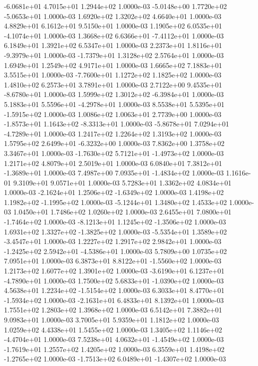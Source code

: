 -6.0681e+01  4.7015e+01  1.2944e+02  1.0000e-03
-5.0148e+00  1.7720e+02 -5.0653e+01  1.0000e-03
1.6920e+02 1.3202e+02 4.6640e+01  1.0000e-03
4.8829e+01 6.1612e+01 9.5150e+01  1.0000e-03
 1.1905e+02  6.0535e+01 -4.1074e+01  1.0000e-03
 1.3668e+02  6.6366e+01 -7.4112e+01  1.0000e-03
6.1849e+01 1.3921e+02 6.5347e+01  1.0000e-03
 2.2373e+01  1.8116e+01 -9.3979e+01  1.0000e-03
-1.7379e+01  1.3128e+02  2.5764e+01  1.0000e-03
1.6949e+01 1.2549e+02 4.9171e+01  1.0000e-03
1.6665e+02 7.1883e+01 3.5515e+01  1.0000e-03
-7.7600e+01  1.1272e+02  1.1825e+02  1.0000e-03
1.4810e+02 6.2573e+01 3.7891e+01  1.0000e-03
 2.7122e+00  9.4535e+01 -8.6780e+01  1.0000e-03
 1.5999e+02  1.3012e+02 -6.3984e+01  1.0000e-03
 5.1883e+01  5.5596e+01 -4.2978e+01  1.0000e-03
 8.5538e+01  5.5395e+01 -1.5915e+02  1.0000e-03
1.0086e+02 1.0063e+01 2.7739e+00  1.0000e-03
-1.8573e+01  1.1643e+02 -8.3313e+01  1.0000e-03
-5.8678e+01  7.0294e+01 -4.7289e+01  1.0000e-03
1.2417e+02 1.2264e+02 1.3193e+02  1.0000e-03
 1.5795e+02  2.6499e+01 -6.3232e+00  1.0000e-03
7.8362e+00 1.3758e+02 3.3467e+01  1.0000e-03
-1.7630e+02  5.7121e+01 -1.4973e+02  1.0000e-03
1.2171e+02 4.8079e+01 2.5019e+01  1.0000e-03
 6.0840e+01  7.3812e+01 -1.3689e+01  1.0000e-03
 7.4987e+00  7.0935e+01 -1.4834e+02  1.0000e-03
1.1616e-01 9.3109e+01 9.0571e+01  1.0000e-03
5.7283e+01 1.3362e+02 4.0834e+01  1.0000e-03
-2.1624e+01  1.2506e+02 -1.6349e+02  1.0000e-03
 1.4198e+02  1.1982e+02 -1.1995e+02  1.0000e-03
-5.1244e+01  1.3480e+02  1.4533e+02  1.0000e-03
1.0450e+01 1.7486e+02 1.0260e+02  1.0000e-03
 2.6455e+01  7.0800e+01 -1.7464e+02  1.0000e-03
-8.1213e+01  1.1245e+02 -1.3506e+02  1.0000e-03
 1.6931e+02  1.3327e+02 -1.3825e+02  1.0000e-03
-5.5354e+01  1.3589e+02 -3.4547e+01  1.0000e-03
1.2227e+02 1.2917e+02 2.9842e+01  1.0000e-03
-1.2425e+02  2.5942e+01 -4.5386e+01  1.0000e-03
5.7809e+00 1.0735e+02 7.0951e+01  1.0000e-03
 6.3873e+01  8.8122e+01 -1.5560e+02  1.0000e-03
1.2173e+02 1.6077e+02 1.3901e+02  1.0000e-03
-3.6190e+01  6.1237e+01 -4.7890e+01  1.0000e-03
 1.7500e+02  5.6833e+01 -1.0390e+02  1.0000e-03
 4.5638e+01  1.2234e+02 -1.5154e+02  1.0000e-03
 6.3033e+01  8.4770e+01 -1.5934e+02  1.0000e-03
-2.1631e+01  6.4833e+01  8.1392e+01  1.0000e-03
1.7551e+02 1.2803e+02 1.3968e+02  1.0000e-03
6.5142e+01 7.3882e+01 9.0983e+01  1.0000e-03
3.7005e+01 5.9359e+01 1.1812e+02  1.0000e-03
1.0259e+02 4.4338e+01 1.5455e+02  1.0000e-03
 1.3405e+02  1.1146e+02 -4.4704e+01  1.0000e-03
 7.5238e+01  4.0632e+01 -1.4549e+02  1.0000e-03
-1.7619e+01  1.2557e+02  1.4205e+02  1.0000e-03
 6.3559e+01  1.4198e+02 -1.2765e+02  1.0000e-03
-1.7513e+02  6.0489e+01 -1.4307e+02  1.0000e-03
